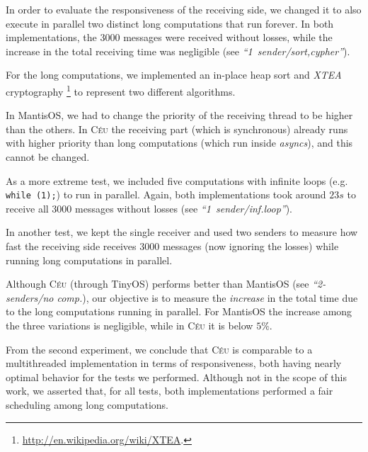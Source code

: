 \documentclass{sig-alternate-ipsn09}
\newcommand{\2}{\;\;}
\newcommand{\5}{\;\;\;\;\;}
\newcommand{\CEU}{\textsc{C\'{e}u}}
\newcommand{\code}[1] {{\small{\texttt{#1}}}}
\begin{document}
In order to evaluate the responsiveness of the receiving side, we changed it to 
also execute in parallel two distinct long computations that run forever.
In both implementations, the $3000$ messages were received without losses, 
while the increase in the total receiving time was negligible (see 
\emph{``1~sender/sort,cypher''}).

For the long computations, we implemented an in-place heap sort and \emph{XTEA} 
cryptography%
\footnote{ \url{http://en.wikipedia.org/wiki/XTEA}. }
to represent two different algorithms.

In MantisOS, we had to change the priority of the receiving thread to be higher 
than the others.
In \CEU{} the receiving part (which is synchronous) already runs with higher 
priority than long computations (which run inside \emph{asyncs}), and this 
cannot be changed.

As a more extreme test, we included five computations with infinite loops (e.g.  
\code{while (1);}) to run in parallel.
Again, both implementations took around $23s$ to receive all $3000$ messages 
without losses (see \emph{``1~sender/inf.loop''}).

In another test, we kept the single receiver and used two senders to measure 
how fast the receiving side receives $3000$ messages (now ignoring the losses) 
while running long computations in parallel.

Although \CEU{} (through TinyOS) performs better than MantisOS (see 
\emph{``2-senders/no comp.}), our objective is to measure the \emph{increase} 
in the total time due to the long computations running in parallel.
For MantisOS the increase among the three variations is negligible, while in 
\CEU{} it is below $5\%$.

From the second experiment, we conclude that \CEU{} is comparable to a 
multithreaded implementation in terms of responsiveness, both having nearly 
optimal behavior for the tests we performed.
Although not in the scope of this work, we asserted that, for all tests, both 
implementations performed a fair scheduling among long computations.

\end{document}
